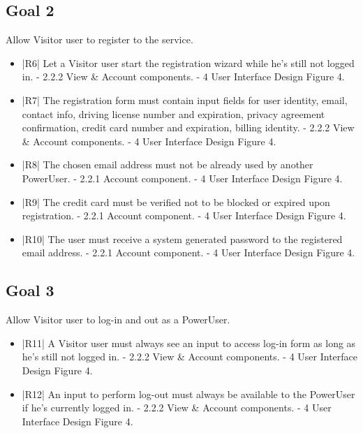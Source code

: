 \subsection {Goal 2} Allow Visitor user to register to the service.
\begin{itemize}
 \item |R6| Let a Visitor user start the registration wizard while he's still not logged in.
    \newline - 2.2.2 View \& Account components.
    \newline - 4 User Interface Design Figure 4.
 \item |R7| The registration form must contain input fields for user identity, email, contact
info, driving license number and expiration, privacy agreement confirmation,
credit card number and expiration, billing identity.
    \newline - 2.2.2 View \& Account components.
    \newline - 4 User Interface Design Figure 4.
 \item |R8| The chosen email address must not be already used by another PowerUser.
    \newline - 2.2.1 Account component.
    \newline - 4 User Interface Design Figure 4.
 \item |R9| The credit card must be verified not to be blocked or expired upon registration.
    \newline - 2.2.1 Account component.
    \newline - 4 User Interface Design Figure 4.
 \item |R10| The user must receive a system generated password to the registered email
address.    
    \newline - 2.2.1 Account component.
    \newline - 4 User Interface Design Figure 4.
\end{itemize}

\subsection {Goal 3} Allow Visitor user to log-in and out as a PowerUser.
\begin{itemize}
 \item |R11| A Visitor user must always see an input to access log-in form as long as he's
still not logged in.
    \newline - 2.2.2 View \& Account components.
    \newline - 4 User Interface Design Figure 4.
 \item |R12| An input to perform log-out must always be available to the PowerUser if he's
currently logged in.
    \newline - 2.2.2 View \& Account components.
    \newline - 4 User Interface Design Figure 4.
\end{itemize}

